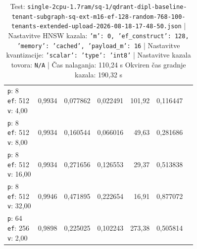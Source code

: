 \begin{table}[htbp]
\begin{tabularx}{\textwidth}{Xrrrrrr}
    \makecell{\texttt{p}: 8\\\texttt{ef}: 512\\\texttt{v}: 4,00} & 0,9934 & 0,077862 & 0,022491 & 101,92 & 0,116447 \\
    \makecell{\texttt{p}: 8\\\texttt{ef}: 512\\\texttt{v}: 8,00} & 0,9934 & 0,160544 & 0,066016 & 49,63 & 0,281686 \\
    \makecell{\texttt{p}: 8\\\texttt{ef}: 512\\\texttt{v}: 16,00} & 0,9934 & 0,271656 & 0,126553 & 29,37 & 0,513838 \\
    \makecell{\texttt{p}: 8\\\texttt{ef}: 512\\\texttt{v}: 32,00} & 0,9946 & 0,471895 & 0,222654 & 16,91 & 0,877072 \\
    \makecell{\texttt{p}: 64\\\texttt{ef}: 256\\\texttt{v}: 2,00} & 0,9898 & 0,225025 & 0,102243 & 273,38 & 0,505814 \\
    \bottomrule
  \end{tabularx}
\caption* {Test: \texttt{single-2cpu-1.7ram/sq-1/qdrant-dipl-baseline-tenant-subgraph-sq-ext-m16-ef-128-random-768-100-tenants-extended-upload-2026-08-18-17-48-50.json} | Nastavitve HNSW kazala: \texttt{{'m': 0, 'ef\_construct': 128, 'memory': 'cached', 'payload\_m': 16}} | Nastavitve kvantizacije: \texttt{{'scalar': {'type': 'int8'}}} | Nastavitve kazala tovora: \texttt{N/A} | Čas nalaganja: 110,24 s Okviren čas gradnje kazala: 190,32 s}\end{table}


